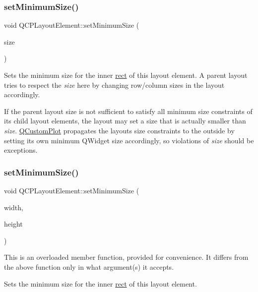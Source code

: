 \subsubsection{\texorpdfstring{set\+Minimum\+Size()}{setMinimumSize()}\hspace{0.1cm}{\footnotesize\ttfamily [1/2]}}
{\footnotesize\ttfamily void Q\+C\+P\+Layout\+Element\+::set\+Minimum\+Size (\begin{DoxyParamCaption}\item[{const Q\+Size \&}]{size }\end{DoxyParamCaption})}

Sets the minimum size for the inner \mbox{\hyperlink{class_q_c_p_layout_element_a208effccfe2cca4a0eaf9393e60f2dd4}{rect}} of this layout element. A parent layout tries to respect the {\itshape size} here by changing row/column sizes in the layout accordingly.

If the parent layout size is not sufficient to satisfy all minimum size constraints of its child layout elements, the layout may set a size that is actually smaller than {\itshape size}. \mbox{\hyperlink{class_q_custom_plot}{Q\+Custom\+Plot}} propagates the layout\textquotesingle{}s size constraints to the outside by setting its own minimum Q\+Widget size accordingly, so violations of {\itshape size} should be exceptions. \mbox{\label{class_q_c_p_layout_element_a8e0447614a0bf92de9a7304588c6b96e}} 
\subsubsection{\texorpdfstring{set\+Minimum\+Size()}{setMinimumSize()}\hspace{0.1cm}{\footnotesize\ttfamily [2/2]}}
{\footnotesize\ttfamily void Q\+C\+P\+Layout\+Element\+::set\+Minimum\+Size (\begin{DoxyParamCaption}\item[{int}]{width,  }\item[{int}]{height }\end{DoxyParamCaption})}

This is an overloaded member function, provided for convenience. It differs from the above function only in what argument(s) it accepts.

Sets the minimum size for the inner \mbox{\hyperlink{class_q_c_p_layout_element_a208effccfe2cca4a0eaf9393e60f2dd4}{rect}} of this layout element. \mbox{\label{class_q_c_p_layout_element_a38975ea13e36de8e53391ce41d94bc0f}} 
